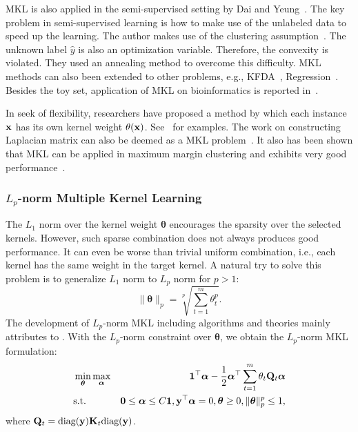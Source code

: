 MKL is also applied in the semi-supervised setting by Dai and Yeung~\cite{icml/DaiY07}. The key problem in semi-supervised learning is how to make use of the unlabeled data to speed up the learning. The author makes use of the clustering assumption~\cite{icml/DaiY07}. The unknown label $\hat{y}$ is also an optimization variable. Therefore, the convexity is violated. They used an annealing method to overcome this difficulty. MKL methods can also been extended to other problems, e.g., KFDA~\cite{icml/FungDBR04,icml/KimMB06}, Regression~\cite{nips/SonnenburgRS05}. Besides the toy set, application of MKL on bioinformatics is reported in~\cite{bioinformatics/LanckrietBCJN04,wabi/OngZ08}.


In seek of flexibility, researchers have proposed a method by which each instance $\mathbf{x}$ has its own kernel weight $\theta(\mathbf{x})$. See~\cite{icml/LewisJN06, icml/GonenA08} for examples. The work on constructing Laplacian matrix can also be deemed as a MKL problem~\cite{nips/ArgyriouHP05}. It also has been shown that MKL can be applied in maximum margin clustering and exhibits very good performance~\cite{aistats/LiTKZ09}.

\subsubsection{$L_p$-norm Multiple Kernel Learning}

The $L_1$ norm over the kernel weight $\bm\theta$ encourages the sparsity over the selected kernels. However, such sparse combination does not always produces good performance. It can even be worse than trivial uniform combination\cite{icml/Cortes09}, i.e., each kernel has the same weight in the target kernel. A natural try to solve this problem is to generalize $L_1$ norm to $L_p$ norm for $p > 1$:
\[
\| \bm\theta \|_p = \sqrt[p]{\sum_{t=1}^{m}\theta_t^p}.
\]
The development of $L_p$-norm MKL including algorithms and theories mainly attributes to \cite{nips/KloftBSLMZ09,ecml/KloftRB10,jmlr/KloftBSZ11}. With the $L_p$-norm constraint over $\bm\theta$, we obtain the $L_p$-norm MKL formulation:
\begin{eqnarray}
&\min_{\boldsymbol{\theta}}\max_{{\boldsymbol{\alpha}}}& \mathbf{1}^\top{\boldsymbol{\alpha}} - \frac{1}{2} {\boldsymbol{\alpha}}^\top \sum_{t=1}^{m}\theta_t\mathbf Q_t{\boldsymbol{\alpha}} \nonumber\\
&{\mbox{s.t.}}& {\mathbf 0}\leq {\boldsymbol{\alpha}} \leq C\mathbf{1}, \mathbf y^\top{\boldsymbol{\alpha}}=0,\boldsymbol{\theta} \geq 0,\| \boldsymbol{\theta} \|_p^p \leq 1,\nonumber
\end{eqnarray}
where $\mathbf Q_t = {\mbox{diag}}(\mathbf{y}){\mathbf K}_t{\mbox{diag}}(\mathbf{y})$.

